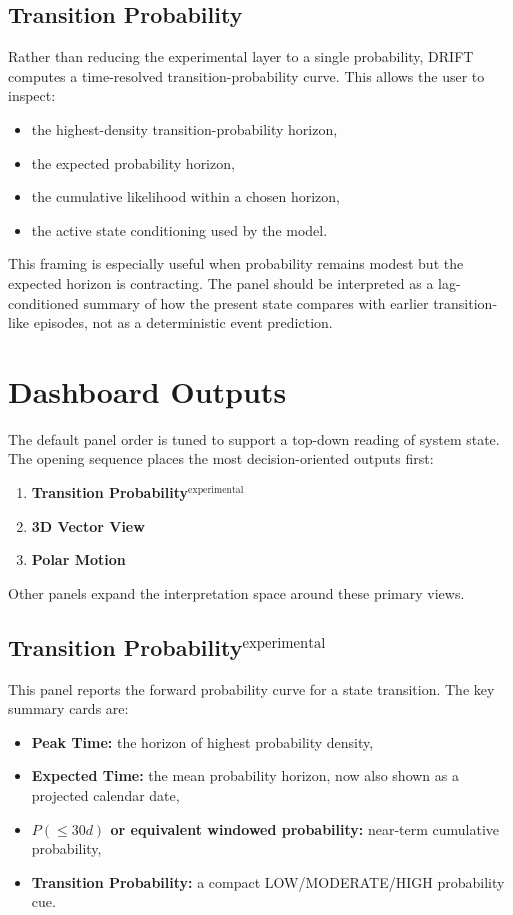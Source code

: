 \documentclass[11pt]{article}
\begin{document}
\subsection{Transition Probability}
Rather than reducing the experimental layer to a single probability, DRIFT computes a time-resolved transition-probability curve. This allows the user to inspect:
\begin{itemize}[leftmargin=1.5em]
  \item the highest-density transition-probability horizon,
  \item the expected probability horizon,
  \item the cumulative likelihood within a chosen horizon,
  \item the active state conditioning used by the model.
\end{itemize}

This framing is especially useful when probability remains modest but the expected horizon is contracting. The panel should be interpreted as a lag-conditioned summary of how the present state compares with earlier transition-like episodes, not as a deterministic event prediction.

\section{Dashboard Outputs}
The default panel order is tuned to support a top-down reading of system state. The opening sequence places the most decision-oriented outputs first:
\begin{enumerate}[leftmargin=1.5em]
  \item \textbf{Transition Probability$^{\mathrm{experimental}}$}
  \item \textbf{3D Vector View}
  \item \textbf{Polar Motion}
\end{enumerate}

Other panels expand the interpretation space around these primary views.

\subsection{Transition Probability$^{\mathrm{experimental}}$}
This panel reports the forward probability curve for a state transition. The key summary cards are:
\begin{itemize}[leftmargin=1.5em]
  \item \textbf{Peak Time:} the horizon of highest probability density,
  \item \textbf{Expected Time:} the mean probability horizon, now also shown as a projected calendar date,
  \item \textbf{$P(\leq 30d)$ or equivalent windowed probability:} near-term cumulative probability,
  \item \textbf{Transition Probability:} a compact LOW/MODERATE/HIGH probability cue.
\end{itemize}
\end{document}
